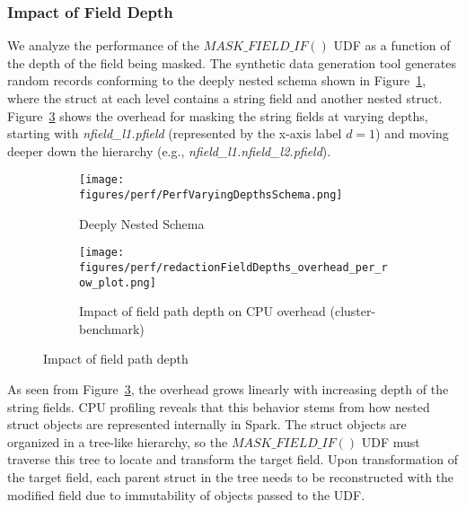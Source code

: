 \subsubsection{Impact of Field Depth} 
We analyze the performance of the $MASK\_FIELD\_IF()$ UDF as a function of the depth of the field being masked. The synthetic data generation tool generates random records conforming to the
 deeply nested schema shown in Figure~\ref{fig:PerfVaryingDepthsSchema}, where the struct at each level contains a string field and another nested
struct. Figure~\ref{fig:PerfVaryingDepthsResult} shows the overhead for masking the string fields at varying depths, starting with
\emph{nfield\_l1.pfield} (represented by the x-axis label $d=1$) and moving deeper down the hierarchy (e.g.,
\emph{nfield\_l1.nfield\_l2.pfield}).
\begin{figure}[ht]  %
\vspace{-1em}
   \begin{subfigure}[b]{0.45\columnwidth}
    \texttt{[image: figures/perf/PerfVaryingDepthsSchema.png]}
    \caption{Deeply Nested Schema}  %
        \label{fig:PerfVaryingDepthsSchema}  %
    \end{subfigure}
    \hfill %
       \begin{subfigure}[b]{0.45\columnwidth}
        \texttt{[image: figures/perf/redactionFieldDepths\_overhead\_per\_row\_plot.png]}
            \caption{Impact of field path depth on CPU overhead (cluster-benchmark)}  %
                \label{fig:PerfVaryingDepthsResult}  %
    \end{subfigure}
    \vspace{-1em}
    \caption{Impact of field path depth}
    \vspace{-1em}
\end{figure}
As seen from Figure~\ref{fig:PerfVaryingDepthsResult}, the overhead grows linearly with increasing depth of the string fields. 
CPU profiling reveals that this behavior stems from how nested struct objects are represented internally in Spark. The struct objects are organized in a tree-like hierarchy, so the
 $MASK\_FIELD\_IF()$ UDF must traverse this tree to locate and transform the target field. Upon transformation of the target field, each parent struct in the tree needs to be reconstructed with the modified field due to 
 immutability of objects passed to the UDF. \\

